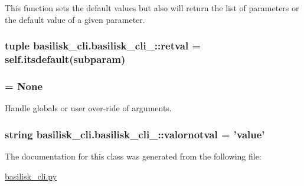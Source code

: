 \-This function sets the default values but also will return the list of parameters or the default value of a given parameter. 

\hypertarget{classbasilisk__cli_1_1basilisk__cli___a62faea308c024c1d5d9a86e28febd36f}{
\subsubsection[{retval}]{\setlength{\rightskip}{0pt plus 5cm}tuple {\bf basilisk\-\_\-cli.\-basilisk\-\_\-cli\-\_\-\-::retval} = self.\-itsdefault(subparam)}}\label{classbasilisk__cli_1_1basilisk__cli___a62faea308c024c1d5d9a86e28febd36f}
\hypertarget{classbasilisk__cli_1_1basilisk__cli___a409317d84e62b1b8b7979369b6cc357b}{
\subsubsection[{rkey}]{ = \-None}}\label{classbasilisk__cli_1_1basilisk__cli___a409317d84e62b1b8b7979369b6cc357b}


\-Handle globals or user over-\/ride of arguments. 

\hypertarget{classbasilisk__cli_1_1basilisk__cli___ae24d0c6557271d183c188999907ab176}{
\subsubsection[{valornotval}]{\setlength{\rightskip}{0pt plus 5cm}string {\bf basilisk\-\_\-cli.\-basilisk\-\_\-cli\-\_\-\-::valornotval} = 'value'}}\label{classbasilisk__cli_1_1basilisk__cli___ae24d0c6557271d183c188999907ab176}


\-The documentation for this class was generated from the following file\-:\begin{DoxyCompactItemize}
\item 
\hyperlink{basilisk__cli_8py}{basilisk\-\_\-cli.\-py}\end{DoxyCompactItemize}
